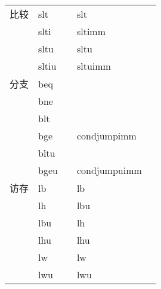\begin{longtable}{lllll}
                               \hline
    比较                         & slt                              &                              & slt                            \\
                               & slti                             &                              & sltimm                         \\
                               & sltu                             &                              & sltu                           \\
                               & sltiu                            &                              & sltuimm                        \\
                               \hline
    分支                       & beq                              &                              &                                \\
                               & bne                              &                              &                                \\
                               & blt                              &                              &                                \\
                              & bge                              & \multirow{-4}{*}{}           & \multirow{-4}{*}{condjumpimm}  \\
                               & bltu                             &                              &                                \\
                              & bgeu                             & \multirow{-2}{*}{}           & \multirow{-2}{*}{condjumpuimm} \\
    \hline
    访存                         &lb                               &                                & lb  \\                    
                                & lh                              &                                & lbu \\
                                & lbu                             &                                & lh  \\
                                & lhu                             &                                & lhu \\
                                & lw                              &                                & lw  \\
                                & lwu                             &                                & lwu \\

\end{longtable}
